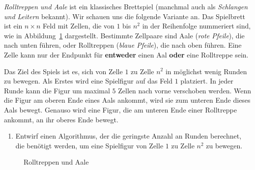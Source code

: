 \documentclass{uebung_cs}
\begin{document}
\begin{aufgabe}
	\emph{Rolltreppen und Aale} ist ein klassisches Brettspiel (manchmal auch als \emph{Schlangen und Leitern} bekannt).
	Wir schauen uns die folgende Variante an.
	Das Spielbrett ist ein $n \times n$ Feld mit Zellen, die von $1$ bis $n^2$ in der Reihenfolge nummeriert sind, wie in Abbildung~\ref{snakesladders} dargestellt.
	Bestimmte Zellpaare sind Aale (\emph{rote Pfeile}), die nach unten führen, oder Rolltreppen (\emph{blaue Pfeile}), die nach oben führen.
	Eine Zelle kann nur der Endpunkt für \textbf{entweder} einen Aal \textbf{oder} eine Rolltreppe sein.

	Das Ziel des Spiels ist es, sich von Zelle $1$ zu Zelle $n^2$ in möglichst wenig Runden zu bewegen.
	Als Erstes wird eine Spielfigur auf das Feld $1$ platziert.
	In jeder Runde kann die Figur um maximal $5$ Zellen nach vorne verschoben werden.
	Wenn die Figur am oberen Ende eines Aals ankommt, wird sie zum unteren Ende dieses Aals bewegt.
	Genauso wird eine Figur, die am unteren Ende einer Rolltreppe ankommt, an ihr oberes Ende bewegt.
	\begin{enumerate}
		\item Entwirf einen Algorithmus, der die geringste Anzahl an Runden berechnet, die benötigt werden, um eine Spielfigur von Zelle $1$ zu Zelle $n^2$ zu bewegen.
	\end{enumerate}
	\begin{center}
		\begin{figure}
			\hspace*{\fill}	
			\hspace*{\fill}	
			\caption{\label{snakesladders}Rolltreppen und Aale}
		\end{figure}
	\end{center}
\end{aufgabe}
\end{document}
